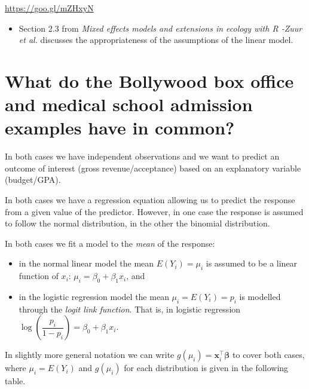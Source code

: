 \documentclass[
  a4paper,
  DIV=11,
  numbers=noendperiod]{scrreprt}
\providecommand{\tightlist}{%
  \setlength{\itemsep}{0pt}\setlength{\parskip}{0pt}}
\newenvironment{fbxSimple}[3]{\begin{tcolorbox}[enhanced, breakable,%
attach boxed title to top*={xshift=1.4pt},
boxed title style={boxrule=0.0mm, fuzzy shadow={1pt}{-1pt}{0mm}{0.1mm}{gray}, arc=.3em, rounded corners=east, sharp corners=west}, colframe=#1-color2, colbacktitle=#1-color1, colback = white, coltitle=black,  titlerule=0mm, toprule=0pt, bottomrule=.7pt, leftrule=.3em, rightrule=.7pt, outer arc=.3em,  	left=.5em, right=.5em, bottomtitle=1mm, toptitle=1mm,title=\textbf{#2}\hspace{0.5em}{#3}]}
{\end{tcolorbox}}
\begin{document}
\label{Weblink-1}
\begin{fbxSimple}{Weblink}{External link 1}{}
\label{Weblink-1}

\url{https://goo.gl/mZHxyN}

\begin{itemize}
\tightlist
\item
  Section 2.3 from \emph{Mixed effects models and extensions in ecology
  with R -Zuur et al.} discusses the appropriateness of the assumptions
  of the linear model.
\end{itemize}

\end{fbxSimple}

\section{What do the Bollywood box office and medical school admission
examples have in
common?}\label{what-do-the-bollywood-box-office-and-medical-school-admission-examples-have-in-common}

In both cases we have independent observations and we want to predict an
outcome of interest (gross revenue/acceptance) based on an explanatory
variable (budget/GPA).

In both cases we have a regression equation allowing us to predict the
response from a given value of the predictor. However, in one case the
response is assumed to follow the normal distribution, in the other the
binomial distribution.

In both cases we fit a model to the \emph{mean} of the response:

\begin{itemize}
\tightlist
\item
  in the normal linear model the mean \(E(Y_i)=\mu_i\) is assumed to be
  a linear function of \(x_i\): \(\mu_i=\beta_0+\beta_1x_i\), and
\item
  in the logistic regression model the mean \(\mu_i=E(Y_i)=p_i\) is
  modelled through the \emph{logit link function}. That is, in logistic
  regression \(\log\left(\dfrac{p_i}{1-p_i}\right)=\beta_0+\beta_1x_i\).
\end{itemize}

In slightly more general notation we can write
\(g(\mu_i)=\boldsymbol{x}_i^{\intercal}\boldsymbol{\beta}\) to cover
both cases, where \(\mu_i=E(Y_i)\) and \(g(\mu_i)\) for each
distribution is given in the following table.
\end{document}
